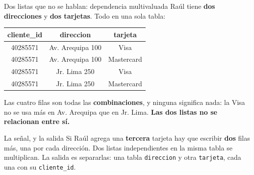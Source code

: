 \documentclass[aspectratio=169,10pt,c]{beamer}
\begin{document}
\begin{frame}{Dos listas que no se hablan: dependencia multivaluada}
\small Raúl tiene \textbf{dos direcciones} y \textbf{dos tarjetas}. Todo en una sola tabla:
\vspace{0.25cm}
\begin{center}
\footnotesize
\begin{tabular}{ccc}
\toprule
\bfseries cliente\_id & \bfseries direccion & \bfseries tarjeta \\
\midrule
40285571 & Av. Arequipa 100 & Visa \\
40285571 & Av. Arequipa 100 & Mastercard \\
40285571 & Jr. Lima 250     & Visa \\
40285571 & Jr. Lima 250     & Mastercard \\
\bottomrule
\end{tabular}
\end{center}
\vspace{0.25cm}
\small Las cuatro filas son todas las \textbf{combinaciones}, y ninguna significa nada: la Visa no se usa más en Av. Arequipa que en Jr. Lima. \textbf{Las dos listas no se relacionan entre sí.}
\vspace{0.3cm}
\begin{alertblock}{La señal, y la salida}
\small Si Raúl agrega una \textbf{tercera} tarjeta hay que escribir \textbf{dos} filas más, una por cada dirección. Dos listas independientes en la misma tabla se multiplican. La salida es separarlas: una tabla \texttt{direccion} y otra \texttt{tarjeta}, cada una con su \texttt{cliente\_id}.
\end{alertblock}
\end{frame}
\end{document}
